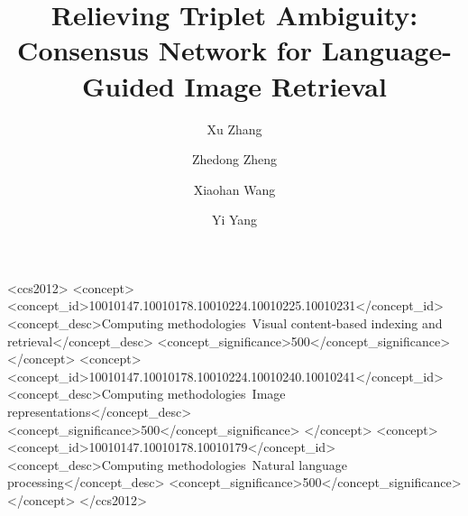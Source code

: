 \documentclass[sigconf]{acmart}
\begin{document}
\title{Relieving Triplet Ambiguity: Consensus Network for Language-Guided Image Retrieval}

\author{  
Xu Zhang} 

\author{Zhedong Zheng}
\author{Xiaohan Wang}
\author{Yi Yang}



\begin{CCSXML}
<ccs2012>
   <concept>
       <concept_id>10010147.10010178.10010224.10010225.10010231</concept_id>
       <concept_desc>Computing methodologies~Visual content-based indexing and retrieval</concept_desc>
       <concept_significance>500</concept_significance>
       </concept>
   <concept>
       <concept_id>10010147.10010178.10010224.10010240.10010241</concept_id>
       <concept_desc>Computing methodologies~Image representations</concept_desc>
       <concept_significance>500</concept_significance>
       </concept>
   <concept>
       <concept_id>10010147.10010178.10010179</concept_id>
       <concept_desc>Computing methodologies~Natural language processing</concept_desc>
       <concept_significance>500</concept_significance>
       </concept>
 </ccs2012>
\end{CCSXML}

\end{document}
